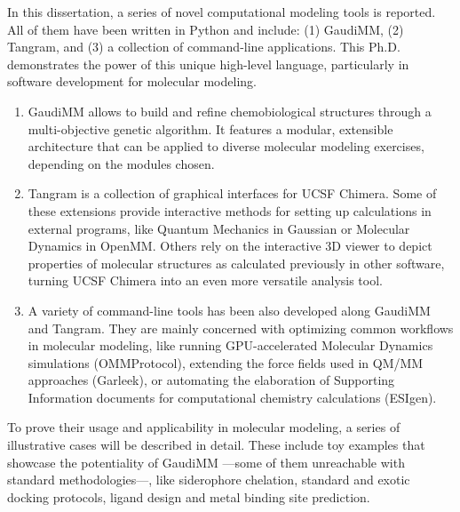 

In this dissertation, a series of novel computational modeling tools is reported. All of them have been written in Python and include: (1) GaudiMM, (2) Tangram, and (3) a collection of command-line applications. This Ph.D. demonstrates the power of this unique high-level language, particularly in software development for molecular modeling.

\begin{enumerate}
    \item GaudiMM allows to build and refine chemobiological structures through a multi-objective genetic algorithm. It features a modular, extensible architecture that can be applied to diverse molecular modeling exercises, depending on the modules chosen.

    \item Tangram is a collection of graphical interfaces for UCSF Chimera. Some of these extensions provide interactive methods for setting up calculations in external programs, like Quantum Mechanics in Gaussian or Molecular Dynamics in OpenMM. Others rely on the interactive 3D viewer to depict properties of molecular structures as calculated previously in other software, turning UCSF Chimera into an even more versatile analysis tool.

    \item A variety of command-line tools has been also developed along GaudiMM and Tangram. They are mainly concerned with optimizing common workflows in molecular modeling, like running GPU-accelerated Molecular Dynamics simulations (OMMProtocol), extending the force fields used in QM/MM approaches (Garleek), or automating the elaboration of Supporting Information documents for computational chemistry calculations (ESIgen).
\end{enumerate}

To prove their usage and applicability in molecular modeling, a series of illustrative cases will be described in detail. These include toy examples that showcase the potentiality of GaudiMM ---some of them unreachable with standard methodologies---, like siderophore chelation, standard and exotic docking protocols, ligand design and metal binding site prediction.